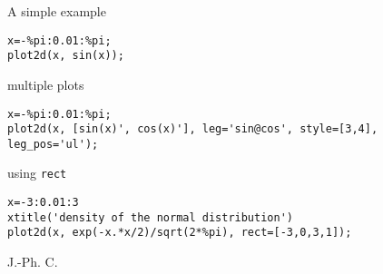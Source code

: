 \begin{examples}

\noindent A simple example

\begin{Verbatim}
x=-%pi:0.01:%pi;
plot2d(x, sin(x));
\end{Verbatim}

\noindent multiple plots

\begin{Verbatim}
x=-%pi:0.01:%pi;
plot2d(x, [sin(x)', cos(x)'], leg='sin@cos', style=[3,4], leg_pos='ul');
\end{Verbatim}

\noindent using \verb!rect!

\begin{Verbatim}
x=-3:0.01:3
xtitle('density of the normal distribution')
plot2d(x, exp(-x.*x/2)/sqrt(2*%pi), rect=[-3,0,3,1]);
\end{Verbatim}
\end{examples}

\begin{manseealso}
\end{manseealso}
\begin{authors}
  J.-Ph. C.
\end{authors}
